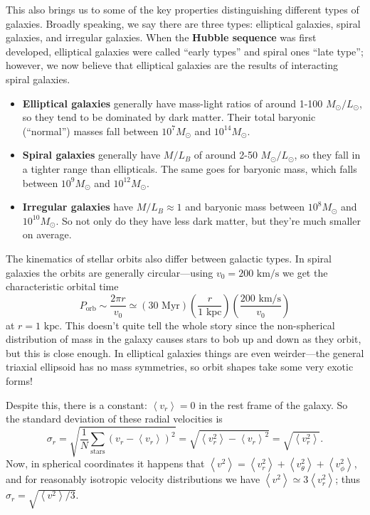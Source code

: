 \documentclass[../a062main.tex]{subfiles}
\begin{document}
This also brings us to some of the key properties distinguishing different types of galaxies.
Broadly speaking, we say there are three types: elliptical galaxies, spiral galaxies, and irregular galaxies.
When the \textbf{Hubble sequence} was first developed, elliptical galaxies were called ``early types'' and spiral ones ``late type''; however, we now believe that elliptical galaxies are the results of interacting spiral galaxies.
\begin{itemize}
    \item \textbf{Elliptical galaxies} generally have mass-light ratios of around 1-100 $M_\odot / L_\odot$, so they tend to be dominated by dark matter.
    Their total baryonic (``normal'') masses fall between $10^{7} M_\odot$ and $10^{14} M_\odot$.

    \item \textbf{Spiral galaxies} generally have $M / L_B$ of around 2-50 $M_\odot / L_\odot$, so they fall in a tighter range than ellipticals.
    The same goes for baryonic mass, which falls between $10^{9} M_\odot$ and $10^{12} M_\odot$.

    \item \textbf{Irregular galaxies} have $M / L_B \approx 1$ and baryonic mass between $10^{8} M_\odot$ and $10^{10} M_\odot$.
    So not only do they have less dark matter, but they're much smaller on average.
\end{itemize}
The kinematics of stellar orbits also differ between galactic types.
In spiral galaxies the orbits are generally circular---using $v_0 = 200 \text{ km/s}$ we get the characteristic orbital time
\[ P_\textrm{orb} \sim \frac{2\pi r}{v_0} \simeq (30 \textrm{ Myr}) \left( \frac{r}{1 \textrm{ kpc}} \right) \left( \frac{200 \textrm{ km/s}}{v_0} \right) \]
at $r = 1 \textrm{ kpc}$.
This doesn't quite tell the whole story since the non-spherical distribution of mass in the galaxy causes stars to bob up and down as they orbit, but this is close enough.
In elliptical galaxies things are even weirder---the general triaxial ellipsoid has no mass symmetries, so orbit shapes take some very exotic forms!

Despite this, there is a constant: $\left< v_r \right> = 0$ in the rest frame of the galaxy.
So the standard deviation of these radial velocities is
\[ \sigma_r = \sqrt{\frac{1}{N} \sum_{\textrm{stars}}^{} \left( v_r - \left< v_r \right> \right)^2} = \sqrt{\left< v_r^2 \right> - \left< v_r \right>^2} = \sqrt{\left< v_r^2 \right>}. \]
Now, in spherical coordinates it happens that $\left< v^2 \right> = \left< v_r^2 \right> + \left< v_\theta^2 \right> + \left< v_\phi^2 \right>$, and for reasonably isotropic velocity distributions we have $\left< v^2 \right> \simeq 3\left< v_r^2 \right>$; thus $\sigma_r = \sqrt{\left< v^2 \right> / 3}$.
\end{document}
